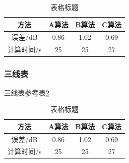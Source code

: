 \documentclass{nwputhesis}
\begin{document}
\begin{table}[H]
    \selectfont
    \caption{表格标题}
    \centering\label{table1}
    \begin{tabular}{|c|c|c|c|}
        \hline %
        方法       & A算法 & B算法 & C算法 \\ \hline
        误差/dB    & 0.86  & 1.02  & 0.69  \\ \hline
        计算时间/s & 25    & 25    & 27    \\ \hline
    \end{tabular}
\end{table}

\subsubsection{三线表}
三线表参考表\ref{table3}
\begin{table}[H]
    \selectfont
    \caption{表格标题}
    \centering\label{table3}
    \begin{tabular}{cccc}
        \toprule[1.5pt]
        方法       & A算法 & B算法 & C算法 \\
        \toprule[1.5pt]
        误差/dB    & 0.86  & 1.02  & 0.69  \\
        计算时间/s & 25    & 25    & 27    \\
        \toprule[1.5pt]
    \end{tabular}
\end{table}
\end{document}
